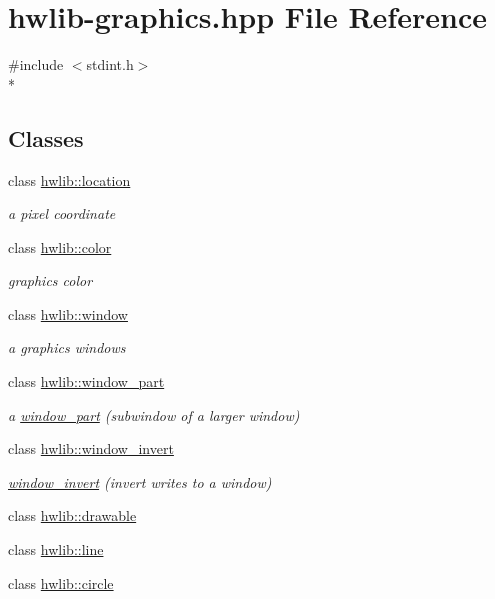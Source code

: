 \hypertarget{hwlib-graphics_8hpp}{}\section{hwlib-\/graphics.hpp File Reference}
\label{hwlib-graphics_8hpp}
{\ttfamily \#include $<$stdint.\+h$>$}\\*
\subsection*{Classes}
\begin{DoxyCompactItemize}
\item 
class \hyperlink{classhwlib_1_1location}{hwlib\+::location}
\begin{DoxyCompactList}\small\item\em a pixel coordinate \end{DoxyCompactList}\item 
class \hyperlink{classhwlib_1_1color}{hwlib\+::color}
\begin{DoxyCompactList}\small\item\em graphics color \end{DoxyCompactList}\item 
class \hyperlink{classhwlib_1_1window}{hwlib\+::window}
\begin{DoxyCompactList}\small\item\em a graphics windows \end{DoxyCompactList}\item 
class \hyperlink{classhwlib_1_1window__part}{hwlib\+::window\+\_\+part}
\begin{DoxyCompactList}\small\item\em a \hyperlink{classhwlib_1_1window__part}{window\+\_\+part} (subwindow of a larger window) \end{DoxyCompactList}\item 
class \hyperlink{classhwlib_1_1window__invert}{hwlib\+::window\+\_\+invert}
\begin{DoxyCompactList}\small\item\em \hyperlink{classhwlib_1_1window__invert}{window\+\_\+invert} (invert writes to a window) \end{DoxyCompactList}\item 
class \hyperlink{classhwlib_1_1drawable}{hwlib\+::drawable}
\item 
class \hyperlink{classhwlib_1_1line}{hwlib\+::line}
\item 
class \hyperlink{classhwlib_1_1circle}{hwlib\+::circle}
\end{DoxyCompactItemize}
